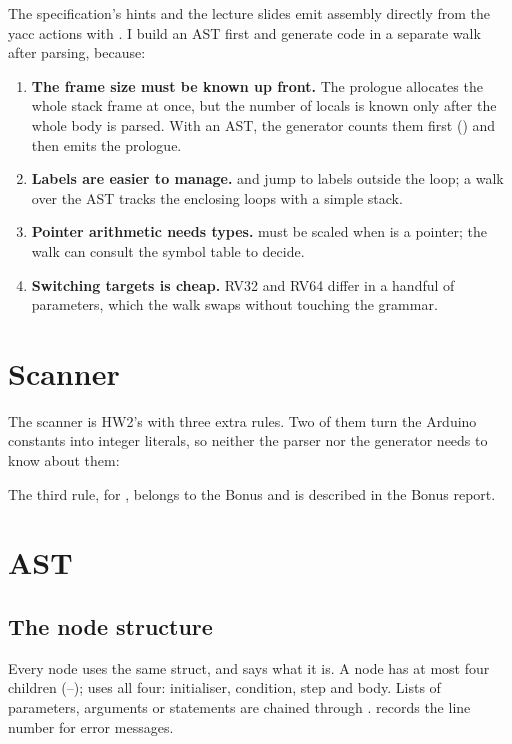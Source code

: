 \documentclass[12pt]{article}
\begin{document}
The specification's hints and the lecture slides emit assembly directly from the yacc actions with
. I build an AST first and generate code in a separate walk after parsing, because:

\begin{enumerate}
  \item \textbf{The frame size must be known up front.} The prologue allocates the whole stack frame at
        once, but the number of locals is known only after the whole body is parsed. With an AST, the
        generator counts them first () and then emits the prologue.
  \item \textbf{Labels are easier to manage.}  and  jump to labels outside the
        loop; a walk over the AST tracks the enclosing loops with a simple stack.
  \item \textbf{Pointer arithmetic needs types.}  must be scaled when  is a pointer; the
        walk can consult the symbol table to decide.
  \item \textbf{Switching targets is cheap.} RV32 and RV64 differ in a handful of parameters, which the walk
        swaps without touching the grammar.
\end{enumerate}

\section{Scanner}

The scanner is HW2's with three extra rules. Two of them turn the Arduino constants into integer
literals, so neither the parser nor the generator needs to know about them:


The third rule, for , belongs to the Bonus and is described in the Bonus report.

\section{AST}

\subsection{The node structure}


Every node uses the same struct, and  says what it is. A node has at most four children
(--);  uses all four: initialiser, condition, step and body. Lists of
parameters, arguments or statements are chained through .  records the line number
for error messages.
\end{document}
